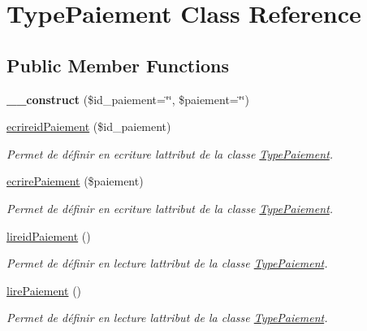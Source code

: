 \hypertarget{class_type_paiement}{}\section{Type\+Paiement Class Reference}
\label{class_type_paiement}
\subsection*{Public Member Functions}
\begin{DoxyCompactItemize}
\item 
\mbox{\label{class_type_paiement_aa01d5f7495d9f76eeec207587e3ab60a}} 
{\bfseries \+\_\+\+\_\+construct} (\$id\+\_\+paiement=\char`\"{}\char`\"{}, \$paiement=\char`\"{}\char`\"{})
\item 
\hyperlink{class_type_paiement_a1567c4c03fa1307f74a4171648bc92c5}{ecrireid\+Paiement} (\$id\+\_\+paiement)
\begin{DoxyCompactList}\small\item\em Permet de définir en ecriture l\textquotesingle{}attribut de la classe \hyperlink{class_type_paiement}{Type\+Paiement}. \end{DoxyCompactList}\item 
\hyperlink{class_type_paiement_ac8d925dbf3baccabd219ce3f9ad1d1e3}{ecrire\+Paiement} (\$paiement)
\begin{DoxyCompactList}\small\item\em Permet de définir en ecriture l\textquotesingle{}attribut de la classe \hyperlink{class_type_paiement}{Type\+Paiement}. \end{DoxyCompactList}\item 
\hyperlink{class_type_paiement_a3002d7b5485b1c7bdefa9836868fe8cb}{lireid\+Paiement} ()
\begin{DoxyCompactList}\small\item\em Permet de définir en lecture l\textquotesingle{}attribut de la classe \hyperlink{class_type_paiement}{Type\+Paiement}. \end{DoxyCompactList}\item 
\hyperlink{class_type_paiement_a8416195716d64a596dc655f94e0b57f8}{lire\+Paiement} ()
\begin{DoxyCompactList}\small\item\em Permet de définir en lecture l\textquotesingle{}attribut de la classe \hyperlink{class_type_paiement}{Type\+Paiement}. \end{DoxyCompactList}\end{DoxyCompactItemize}


